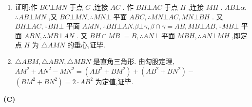 \begin{enumerate}
\begin{center}
    \end{center}
    \begin{jieda}
        \begin{enumerate}
            \item 证明:作 ${BC}\bot {MN}$ 于点 $C$ ,连接 ${AC}$ . 作 ${BH}\bot {AC}$ 于点 $H$ ,连接 ${MH}$ . ${AB}\bot \alpha$. $\therefore {AB}\bot {MN}$ ,又 ${BC}\bot {MN},\therefore {MN}\bot$ 平面 ${ABC},\therefore {MN}\bot {AC},{MN}\bot {BH}$ . 又 ${BH}\bot {AC},\therefore {BH}\bot$ 平面 ${AMN},\therefore {BH} \bot  {AN}.\beta  \bot  \gamma ,\beta  \cap  \gamma  = {AB},{MB} \bot  {AB},\therefore {MB} \bot$ 平面 ${ABN},\therefore {MB} \bot  {AN}$ . 又 ${BH} \cap  {MB}$  $= B,\therefore {AN} \bot$ 平面 ${MBH},\therefore {AN} \bot  {MH}$ ,即定点 $H$ 为 $\bigtriangleup {AMN}$ 的垂心,证毕.
            \item $\bigtriangleup  {ABM}, \bigtriangleup  {ABN}, \bigtriangleup  {MBN}$ 是直角三角形. 由勾股定理, $A{M}^{2} + A{N}^{2} - M{N}^{2} = \left( {A{B}^{2} + B{M}^{2}}\right)  + \left( {A{B}^{2} + B{N}^{2}}\right)  -$  $\left( {B{M}^{2} + B{N}^{2}}\right)  = 2 \cdot  A{B}^{2}$ 为定值,证毕.
        \end{enumerate}
    \end{jieda}
\end{enumerate}
\begin{center}  \textbf{(C)} \end{center}
